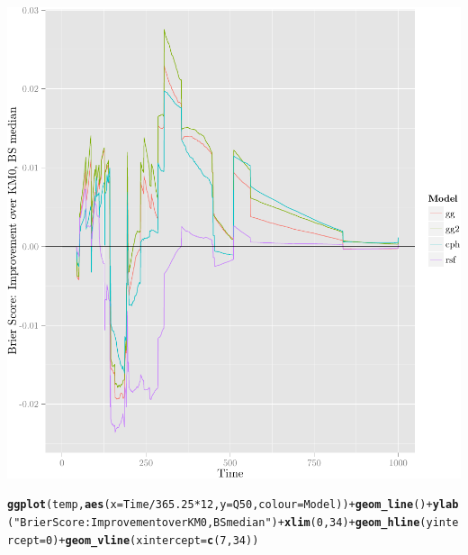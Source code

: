 \documentclass{article}\usepackage[]{graphicx}\usepackage[]{color}
\makeatletter
\def\maxwidth{ %
  \ifdim\Gin@nat@width>\linewidth
    \linewidth
  \else
    \Gin@nat@width
  \fi
}
\newcommand{\hlnum}[1]{\textcolor[rgb]{0.686,0.059,0.569}{#1}}%
\newcommand{\hlstr}[1]{\textcolor[rgb]{0.192,0.494,0.8}{#1}}%
\newcommand{\hlopt}[1]{\textcolor[rgb]{0,0,0}{#1}}%
\newcommand{\hlstd}[1]{\textcolor[rgb]{0.345,0.345,0.345}{#1}}%
\newcommand{\hlkwc}[1]{\textcolor[rgb]{0.333,0.667,0.333}{#1}}%
\newcommand{\hlkwd}[1]{\textcolor[rgb]{0.737,0.353,0.396}{\textbf{#1}}}%
\newenvironment{kframe}{%
 \def\at@end@of@kframe{}%
 \ifinner\ifhmode%
  \def\at@end@of@kframe{\end{minipage}}%
  \begin{minipage}{\columnwidth}%
 \fi\fi%
 \def\FrameCommand##1{\hskip\@totalleftmargin \hskip-\fboxsep
 \colorbox{shadecolor}{##1}\hskip-\fboxsep
     \hskip-\linewidth \hskip-\@totalleftmargin \hskip\columnwidth}%
 \MakeFramed {\advance\hsize-\width
   \@totalleftmargin\z@ \linewidth\hsize
   \@setminipage}}%
 {\par\unskip\endMakeFramed%
 \at@end@of@kframe}
\newenvironment{knitrout}{}{} %
\makeatother
\begin{document}
\begin{knitrout}
{\centering \includegraphics[width=\maxwidth]{figure/05-model-selection-bs-paths-5} 

}


\begin{kframe}\begin{alltt}
\hlkwd{ggplot}\hlstd{(temp,} \hlkwd{aes}\hlstd{(}\hlkwc{x} \hlstd{= Time}\hlopt{/}\hlnum{365.25}\hlopt{*}\hlnum{12}\hlstd{,} \hlkwc{y} \hlstd{= Q50,} \hlkwc{colour} \hlstd{= Model))} \hlopt{+} \hlkwd{geom_line}\hlstd{()} \hlopt{+} \hlkwd{ylab}\hlstd{(}\hlstr{"Brier Score: Improvement over KM0, BS median"}\hlstd{)} \hlopt{+} \hlkwd{xlim}\hlstd{(}\hlnum{0}\hlstd{,} \hlnum{34}\hlstd{)} \hlopt{+} \hlkwd{geom_hline}\hlstd{(}\hlkwc{yintercept} \hlstd{=} \hlnum{0}\hlstd{)} \hlopt{+} \hlkwd{geom_vline}\hlstd{(}\hlkwc{xintercept} \hlstd{=} \hlkwd{c}\hlstd{(}\hlnum{7}\hlstd{,} \hlnum{34}\hlstd{))}
\end{alltt}
\end{kframe}


\end{knitrout}
\end{document}
